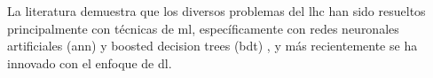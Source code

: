 La literatura demuestra que los diversos problemas del \acrshort{lhc} han sido resueltos principalmente con técnicas de \acrshort{ml}, específicamente con redes neuronales artificiales (\acrshort{ann}) y boosted decision trees (\acrshort{bdt}) \cite{Radovic2018}, y más recientemente se ha innovado con el enfoque de \acrshort{dl}.

%

%


